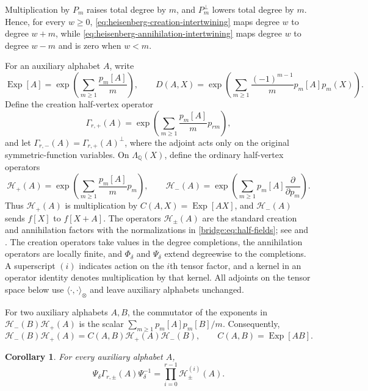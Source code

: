 \documentclass[12pt,reqno,a4paper]{amsart}
\numberwithin{equation}{section}
\numberwithin{figure}{section}
\theoremstyle{plain}
\newtheorem{corollary}[theorem]{Corollary}
\theoremstyle{definition}
\begin{document}
Multiplication by $P_m$ raises total degree by $m$, and
$P_m^{\perp}$ lowers total degree by $m$.  Hence, for every $w\geq0$,
\eqref{eq:heisenberg-creation-intertwining} maps degree $w$ to
degree $w+m$, while \eqref{eq:heisenberg-annihilation-intertwining}
maps degree $w$ to degree $w-m$ and is zero when $w<m$.

For an auxiliary alphabet $A$, write
\[
 \operatorname{Exp}[A]
 =\exp\left(\sum_{m\geq1}\frac{p_m[A]}m\right),
 \qquad
 D(A,X)=\exp\left(
   \sum_{m\geq1}\frac{(-1)^{m-1}}m p_m[A]p_m(X)\right).
\]
Define the creation half-vertex operator
\begin{equation}\label{eq:creation-half-vertex}
 \Gamma_{r,+}(A)
 =\exp\left(\sum_{m\geq1}\frac{p_m[A]}m p_{rm}\right),
\end{equation}
and let $\Gamma_{r,-}(A)=\Gamma_{r,+}(A)^\perp$, where the adjoint
acts only on the original symmetric-function variables.  On
$\Lambda_{\mathbb Q}(X)$, define the ordinary half-vertex operators
\begin{equation}\label{bridge:eq:half-fields}
 \mathcal H_+(A)
 =\exp\left(\sum_{m\geq1}\frac{p_m[A]}m p_m\right),
 \qquad
 \mathcal H_-(A)
 =\exp\left(\sum_{m\geq1}p_m[A]
                  \frac{\partial}{\partial p_m}\right).
\end{equation}
Thus $\mathcal H_+(A)$ is multiplication by
$C(A,X)=\operatorname{Exp}[AX]$, and $\mathcal H_-(A)$ sends $f[X]$ to
$f[X+A]$.  The operators $\mathcal H_\pm(A)$ are the standard creation
and annihilation factors with the normalizations in
\eqref{bridge:eq:half-fields}; see \cite[Section~4]{DLT}
and \cite{JingVertex}.  The creation operators take values in
the degree completions, the annihilation operators are locally finite,
and $\Phi_\delta$ and $\Psi_\delta$ extend degreewise to the
completions.  A superscript $(i)$ indicates action on the $i$th tensor
factor, and a kernel in an operator identity denotes multiplication
by that kernel.
All adjoints on the tensor space below use
$\langle\cdot,\cdot\rangle_{\otimes}$ and leave auxiliary alphabets
unchanged.

For two auxiliary alphabets $A,B$, the commutator of the exponents
in $\mathcal H_-(B)\mathcal H_+(A)$ is the scalar
$\sum_{m\geq1}p_m[A]p_m[B]/m$.  Consequently,
\begin{equation}\label{bridge:eq:half-commutation}
 \mathcal H_-(B)\mathcal H_+(A)
 =C(A,B)\mathcal H_+(A)\mathcal H_-(B),
 \qquad C(A,B)=\operatorname{Exp}[AB].
\end{equation}

\begin{corollary}
\label{cor:half-vertex-factorization}
For every auxiliary alphabet $A$,
\begin{equation}\label{bridge:eq:half-fields-core-quotient}
 \Psi_\delta\Gamma_{r,\pm}(A)\Psi_\delta^{-1}
 =\prod_{i=0}^{r-1}\mathcal H_\pm^{(i)}(A).
\end{equation}
\end{corollary}
\end{document}

